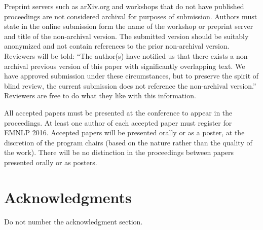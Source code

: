 \documentclass[11pt,letterpaper]{article}
\begin{document}
Preprint servers such as arXiv.org and workshops that do not have
published proceedings are not considered
archival for purposes of submission. Authors must state in the online submission
form the name of the workshop or preprint server and title of the non-archival
version. The submitted version should be suitably anonymized and not contain
references to the prior non-archival version. Reviewers will be told: ``The
author(s) have notified us that there exists a non-archival previous version of
this paper with significantly overlapping text. We have approved submission under
these circumstances, but to preserve the spirit of blind review, the current
submission does not reference the non-archival version.'' Reviewers are free to do
what they like with this information.

All accepted papers must be presented at the conference to appear in the
proceedings. At least one author of each accepted paper must register for EMNLP
2016. Accepted papers will be presented orally or as a poster, at the discretion
of the program chairs (based on the nature rather than the quality of the work).
There will be no distinction in the proceedings between papers presented orally
or as posters.

\section*{Acknowledgments}

Do not number the acknowledgment section.



\end{document}
